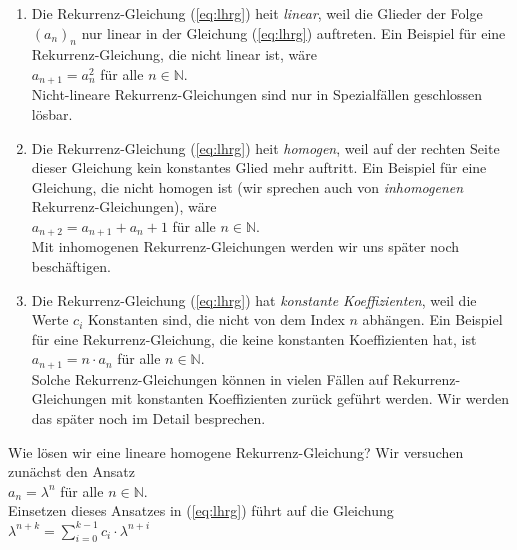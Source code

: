 \begin{enumerate}
\item Die Rekurrenz-Gleichung (\ref{eq:lhrg}) hei\3t \emph{linear}, weil die Glieder der Folge $(a_n)_n$ nur
      linear in der Gleichung (\ref{eq:lhrg}) auftreten.  Ein Beispiel f\"ur eine
      Rekurrenz-Gleichung, die nicht linear ist, w\"are \\[0.1cm]
      \hspace*{1.3cm} $a_{n+1} = a_n^2$ \quad f\"ur alle $n \in \mathbb{N}$. \\[0.1cm]
      Nicht-lineare Rekurrenz-Gleichungen sind nur in Spezialf\"allen geschlossen l\"osbar.
\item Die Rekurrenz-Gleichung (\ref{eq:lhrg}) hei\3t \emph{homogen}, weil auf der rechten Seite
      dieser Gleichung kein konstantes Glied mehr auftritt.  Ein Beispiel f\"ur eine
      Gleichung, die nicht homogen ist (wir sprechen auch von \emph{inhomogenen}
      Rekurrenz-Gleichungen), w\"are \\[0.1cm]
      \hspace*{1.3cm} $a_{n+2} = a_{n+1} + a_n + 1$ \quad f\"ur alle $n \in \mathbb{N}$. \\[0.1cm]
      Mit inhomogenen Rekurrenz-Gleichungen werden wir uns sp\"ater noch besch\"aftigen.
\item Die Rekurrenz-Gleichung (\ref{eq:lhrg}) hat \emph{konstante Koeffizienten}, weil die
      Werte $c_i$ Konstanten sind, die nicht von dem Index $n$ abh\"angen.  Ein Beispiel f\"ur
      eine Rekurrenz-Gleichung, die keine konstanten Koeffizienten hat, ist \\[0.1cm]
      \hspace*{1.3cm} $a_{n+1} = n\cdot a_n$ \quad f\"ur alle $n \in \mathbb{N}$. \\[0.1cm]
      Solche Rekurrenz-Gleichungen k\"onnen in vielen F\"allen auf Rekurrenz-Gleichungen mit
      konstanten Koeffizienten zur\"uck gef\"uhrt werden.  Wir werden das sp\"ater noch im
      Detail besprechen.
\end{enumerate}
Wie l\"osen wir eine lineare homogene Rekurrenz-Gleichung?  Wir versuchen zun\"achst den Ansatz\\[0.1cm]
\hspace*{1.3cm}  $a_n = \lambda^n$ \quad f\"ur alle $n \in \mathbb{N}$. \\[0.1cm]
Einsetzen dieses Ansatzes in (\ref{eq:lhrg}) f\"uhrt auf die Gleichung \\[0.1cm]
\hspace*{1.3cm}
$\lambda^{n+k} = \sum\limits_{i=0}^{k-1} c_i \cdot \lambda^{n+i}$
